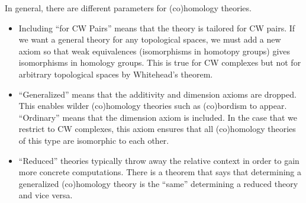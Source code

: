 \documentclass[a4paper]{article}
\begin{document}
In general, there are different parameters for (co)homology theories. 
\begin{itemize}
\item Including ``for CW Pairs'' means that the theory is tailored for CW pairs. If we want a general theory for any topological spaces, we must add a new axiom so that weak equivalences (isomorphisms in homotopy groups) gives isomorphisms in homology groups. This is true for CW complexes but not for arbitrary topological spaces by Whitehead's theorem. 
\item ``Generalized'' means that the additivity and dimension axioms are dropped. This enables wilder (co)homology theories such as (co)bordism to appear. ``Ordinary'' means that the dimension axiom is included. In the case that we restrict to CW complexes, this axiom ensures that all (co)homology theories of this type are isomorphic to each other. 
\item ``Reduced'' theories typically throw away the relative context in order to gain more concrete computations. There is a theorem that says that determining a generalized (co)homology theory is the ``same'' determining a reduced theory and vice versa. 
\end{itemize}
\end{document}
